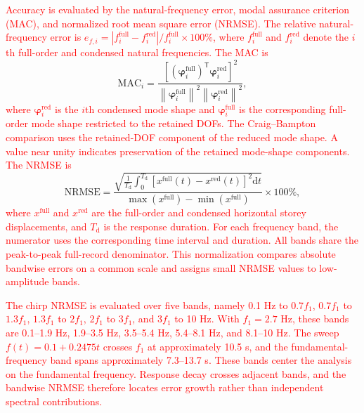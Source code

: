 \documentclass[11pt,a4paper]{article}
\numberwithin{equation}{section}
\newcommand{\rev}[1]{\textcolor{red}{#1}}
\begin{document}
\rev{Accuracy is evaluated by the natural-frequency error, modal assurance criterion (MAC), and normalized root mean square error (NRMSE). The relative natural-frequency error is \(e_{f,i}=|f_{i}^{\mathrm{full}}-f_{i}^{\mathrm{red}}|/f_{i}^{\mathrm{full}}\times100\%\), where \(f_{i}^{\mathrm{full}}\) and \(f_{i}^{\mathrm{red}}\) denote the \(i\)th full-order and condensed natural frequencies. The MAC is}
\begin{equation}
	\mathrm{MAC}_{i}=
	\frac{\left[\left(\bm{\varphi}_{i}^{\mathrm{full}}\right)^{\mathsf{T}}
		\bm{\varphi}_{i}^{\mathrm{red}}\right]^{2}}
	{\left\|\bm{\varphi}_{i}^{\mathrm{full}}\right\|^{2}
		\left\|\bm{\varphi}_{i}^{\mathrm{red}}\right\|^{2}},
	\label{eq:mac}
\end{equation}
\rev{where \(\bm{\varphi}_{i}^{\mathrm{red}}\) is the \(i\)th condensed mode shape and \(\bm{\varphi}_{i}^{\mathrm{full}}\) is the corresponding full-order mode shape restricted to the retained DOFs. The Craig--Bampton comparison uses the retained-DOF component of the reduced mode shape. A value near unity indicates preservation of the retained mode-shape components. The NRMSE is}
\begin{equation}
	\mathrm{NRMSE}=
	\frac{\displaystyle\sqrt{\frac{1}{T_{\mathrm{d}}}\int_{0}^{T_{\mathrm{d}}}
			\left[x^{\mathrm{full}}(t)-x^{\mathrm{red}}(t)\right]^{2}\mathrm{d}t}}
	{\max\left(x^{\mathrm{full}}\right)-\min\left(x^{\mathrm{full}}\right)}
	\times100\%,
	\label{eq:nrmse}
\end{equation}
\rev{where \(x^{\mathrm{full}}\) and \(x^{\mathrm{red}}\) are the full-order and condensed horizontal storey displacements, and \(T_{\mathrm{d}}\) is the response duration. For each frequency band, the numerator uses the corresponding time interval and duration. All bands share the peak-to-peak full-record denominator. This normalization compares absolute bandwise errors on a common scale and assigns small NRMSE values to low-amplitude bands.}

\rev{The chirp NRMSE is evaluated over five bands, namely 0.1 Hz to \(0.7f_{1}\), \(0.7f_{1}\) to \(1.3f_{1}\), \(1.3f_{1}\) to \(2f_{1}\), \(2f_{1}\) to \(3f_{1}\), and \(3f_{1}\) to 10 Hz. With \(f_{1}=2.7\) Hz, these bands are 0.1--1.9 Hz, 1.9--3.5 Hz, 3.5--5.4 Hz, 5.4--8.1 Hz, and 8.1--10 Hz. The sweep \(f(t)=0.1+0.2475t\) crosses \(f_{1}\) at approximately 10.5 s, and the fundamental-frequency band spans approximately 7.3--13.7 s. These bands center the analysis on the fundamental frequency. Response decay crosses adjacent bands, and the bandwise NRMSE therefore locates error growth rather than independent spectral contributions.}
\end{document}
